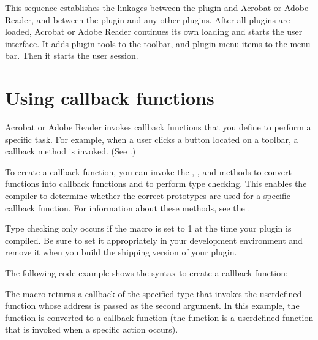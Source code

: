 \documentclass[letterpaper,12pt,english,openany,oneside]{sphinxmanual}
\begin{document}
This sequence establishes the linkages between the plugin and Acrobat or Adobe Reader, and between the plugin and any other plugins. After all plugins are loaded, Acrobat or Adobe Reader continues its own loading and starts the user interface. It adds plugin tools to the toolbar, and plugin menu items to the menu bar. Then it starts the user session.


\section{Using callback functions}
\label{\detokenize{Plugins_Pimech:using-callback-functions}}
Acrobat or Adobe Reader invokes callback functions that you define to perform a specific task. For example, when a user clicks a button located on a toolbar, a callback method is invoked. (See .)

To create a callback function, you can invoke the , , and  methods to convert functions into callback functions and to perform type checking. This enables the compiler to determine whether the correct prototypes are used for a specific callback function. For information about these methods, see the .

Type checking only occurs if the  macro is set to 1 at the time your plug\sphinxhyphen{}in is compiled. Be sure to set it appropriately in your development environment and remove it when you build the shipping version of your plugin.

The following code example shows the syntax to create a callback function:

\begin{sphinxVerbatim}[commandchars=\\\{\}]
   
   
\end{sphinxVerbatim}

The  macro returns a callback of the specified type that invokes the user\sphinxhyphen{}defined function whose address is passed as the second argument. In this example, the  function is converted to a callback function (the  function is a user\sphinxhyphen{}defined function that is invoked when a specific action occurs).
\end{document}
